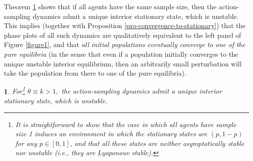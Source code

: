 \documentclass[12pt]{article}
\numberwithin{equation}{section}
\numberwithin{figure}{section}
\theoremstyle{definition}
\theoremstyle{plain}
\theoremstyle{plain}
\theoremstyle{plain}
\newtheorem{thm}{\protect\theoremname}
\theoremstyle{remark}
\theoremstyle{plain}
\theoremstyle{plain}
\providecommand{\theoremname}{Theorem}
\begin{document}
Theorem \ref{thm:unstableinterior_ASD} shows that if all agents have the same sample size, then the action-sampling dynamics admit a unique interior stationary state, which is unstable. This implies (together with Proposition \ref{pro-convergence-to-stationary}) that the phase plots of all such dynamics are qualitatively equivalent to the left panel of Figure \ref{figure1}, and that \emph{all initial populations eventually converge to one of the pure equilibria}
(in the sense that even if a population initially converges to the unique unstable interior equilibrium, then an arbitrarily small perturbation will take the population from there to one of the pure equilibria). 
\begin{thm}\label{thm:unstableinterior_ASD}
For\footnote{\label{foot-k-1}
It is straightforward to show that the case in which all agents have sample size 1 induces an environment in which the stationary states are $(p,1-p)$ for any $p\in[0,1]$, and that all these states are neither asymptotically stable nor 
unstable (i.e., they are Lyaponouv stable).} 
$\theta\equiv k>1,$ the action-sampling dynamics admit a unique interior stationary state, which is unstable.
\end{thm}
\end{document}
